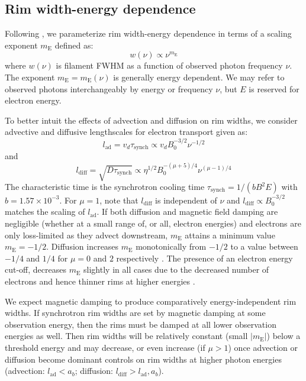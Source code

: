 \documentclass[iop, apj, numberedappendix]{emulateapj}
\newcommand*{\mt}{\mathrm}
\newcommand*{\tsynch}{\tau_{\mt{synch}}}
\newcommand*{\mE}{m_\mt{E}}
\begin{document}
\subsection{Rim width-energy dependence} \label{sec:energydep}

Following , we parameterize rim width-energy dependence
in terms of a scaling exponent $\mE$ defined as:
\begin{equation}
    w(\nu) \propto \nu^{\mE}
\end{equation}
where $w(\nu)$ is filament FWHM as a function of observed photon frequency
$\nu$.  The exponent $\mE = \mE(\nu)$ is generally energy dependent.  We may
refer to observed photons interchangeably by energy or frequency $\nu$, but $E$
is reserved for electron energy.

To better intuit the effects of advection and diffusion on rim widths, we
consider advective and diffusive lengthscales for electron transport given as:
\begin{equation} \label{eq:lad}
    l_{\mt{ad}} = v_d \tsynch \propto v_d B_0^{-3/2} \nu^{-1/2}
\end{equation}
and
\begin{equation} \label{eq:ldiff}
    l_{\mt{diff}} = \sqrt{D \tsynch}
                  \propto \eta^{1/2} B_0^{-(\mu+5)/4} \nu^{(\mu-1)/4}
\end{equation}
The characteristic time is the synchrotron cooling time
$\tsynch = 1 / (b B^2 E)$ with $b = 1.57 \times 10^{-3}$.
For $\mu = 1$, note that $l_{\mt{diff}}$ is independent of $\nu$ and
$l_{\mt{diff}} \propto B_0^{-3/2}$ matches the scaling of $l_{\mt{ad}}$.
If both diffusion and magnetic field damping are negligible (whether at a small
range of, or all, electron energies) and electrons are only loss-limited as
they advect downstream, $\mE$ attains a minimum value $\mE = -1/2$.  Diffusion
increases $\mE$ monotonically from $-1/2$ to a value between $-1/4$ and $1/4$
for $\mu = 0$ and $2$ respectively .  The
presence of an electron energy cut-off, decreases $\mE$ slightly in all cases
due to the decreased number of electrons and hence thinner rims at higher
energies .

We expect magnetic damping to produce comparatively energy-independent rim
widths.  If synchrotron rim widths are set by magnetic damping
at some observation energy, then the rims must be damped at all lower
observation energies as well.  Then rim widths will be relatively constant
(small $|\mE|$) below a threshold energy and may decrease, or even increase
(if $\mu > 1$) once advection or diffusion become dominant controls on rim
widths at higher photon energies (advection: $l_\mt{ad} < a_b$;
diffusion: $l_{\mt{diff}} > l_{\mt{ad}}, a_b$).
\end{document}
